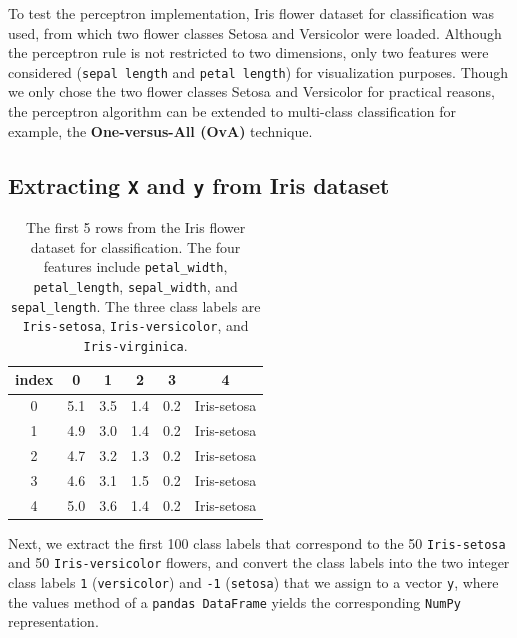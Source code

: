 \documentclass[11pt]{article}
\begin{document}
    To test the perceptron implementation, Iris flower dataset for classification was used, from which two flower classes Setosa and Versicolor were loaded.
    Although the perceptron rule is not restricted to two dimensions, only two features were considered (\texttt{sepal length} and \texttt{petal length}) for visualization purposes.
    Though we only chose the two flower classes Setosa and Versicolor for practical reasons, the perceptron algorithm can be extended to multi-class classification \textemdash for example, the \textbf{One-versus-All (OvA)} technique.

    \subsection{Extracting \texttt{X} and \texttt{y} from Iris dataset} \label{subsec:perc_iris_extract}

    \begin{table}[h!]
        \centering
        \begin{tabular}{||c | c c c c | c||}
            \hline
            index & 0 & 1 & 2 & 3 & 4 \\
            \hline
            \hline
            0 & 5.1 & 3.5 & 1.4 & 0.2 & Iris-setosa \\
            \hline
            1 & 4.9 & 3.0 & 1.4 & 0.2 & Iris-setosa \\
            \hline
            2 & 4.7 & 3.2 & 1.3 & 0.2 & Iris-setosa \\
            \hline
            3 & 4.6 & 3.1 & 1.5 & 0.2 & Iris-setosa \\
            \hline
            4 & 5.0 & 3.6 & 1.4 & 0.2 & Iris-setosa \\
            \hline
        \end{tabular}
        \caption{The first 5 rows from the Iris flower dataset for classification.
        The four features include \texttt{petal\_width}, \texttt{petal\_length}, \texttt{sepal\_width}, and \texttt{sepal\_length}.
        The three class labels are \texttt{Iris-setosa}, \texttt{Iris-versicolor}, and \texttt{Iris-virginica}.}
        \label{tab:iris}

    \end{table}

    Next, we extract the first 100 class labels that correspond to the 50 \texttt{Iris-setosa} and 50 \texttt{Iris-versicolor} flowers, and convert the class labels into the two integer class labels \texttt{1} (\texttt{versicolor}) and \texttt{-1} (\texttt{setosa}) that we assign to a vector \texttt{y}, where the values method of a \texttt{pandas DataFrame} yields the corresponding \texttt{NumPy} representation.
\end{document}
